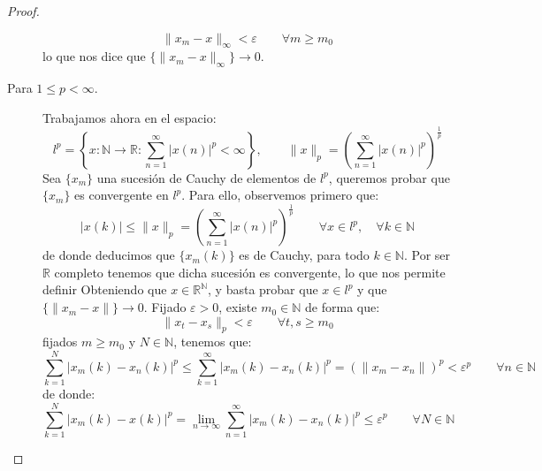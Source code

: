 \begin{prop}
\begin{proof}
\begin{description}
                \begin{equation*}
                    \|x_m - x\|_\infty < \varepsilon\qquad \forall m\geq m_0
                \end{equation*}
                lo que nos dice que $\{\|x_m-x\|_\infty\}\to 0$.
            \item [Para $1\leq p < \infty$.] Trabajamos ahora en el espacio:
                \begin{equation*}
                    l^p = \left\{x:\mathbb{N}\to \mathbb{R} : \sum_{n=1}^{\infty}{|x(n)|}^{p}<\infty\right\}, \qquad \|x\|_p = {\left(\sum_{n=1}^{\infty}{|x(n)|}^{p}\right)}^{\frac{1}{p}}
                \end{equation*}
                Sea $\{x_m\}$ una sucesión de Cauchy de elementos de $l^p$, queremos probar que $\{x_m\}$ es convergente en $l^p$. Para ello, observemos primero que:
                \begin{equation*}
                    |x(k)| \leq \|x\|_p = {\left(\sum_{n=1}^{\infty}{|x(n)|}^{p}\right)}^{\frac{1}{p}} \qquad \forall x\in l^p, \quad \forall k\in \mathbb{N}
                \end{equation*}
                de donde deducimos que $\{x_m(k)\}$ es de Cauchy, para todo $k\in \mathbb{N}$. Por ser $\mathbb{R}$ completo tenemos que dicha sucesión es convergente, lo que nos permite definir
                Obteniendo que $x\in \mathbb{R}^\mathbb{N}$, y basta probar que $x\in l^p$ y que $\{\|x_m - x\|\}\to 0$. Fijado $\varepsilon>0$, existe $m_0\in \mathbb{N}$ de forma que:
                \begin{equation*}
                    \|x_t - x_s\|_p< \varepsilon\qquad \forall t,s\geq m_0
                \end{equation*}
                fijados $m\geq m_0$ y $N\in \mathbb{N}$, tenemos que:
                \begin{equation*}
                    \sum_{k=1}^{N}{|x_m(k) - x_n(k)|}^{p} \leq \sum_{k=1}^{\infty}{|x_m(k) - x_n(k)|}^{p} = {(\|x_m - x_n\|)}^{p} < \varepsilon^p \qquad \forall n\in \mathbb{N}
                \end{equation*}
                de donde:
                \begin{equation*}
                    \sum_{k=1}^{N}{|x_m(k) - x(k)|}^{p} = \lim_{n\to\infty}\sum_{n=1}^{\infty}{|x_m(k) -x_n(k)|}^{p} \leq \varepsilon^p  \qquad \forall N\in \mathbb{N}
                \end{equation*}

\end{description}
\end{proof}
\end{prop}
